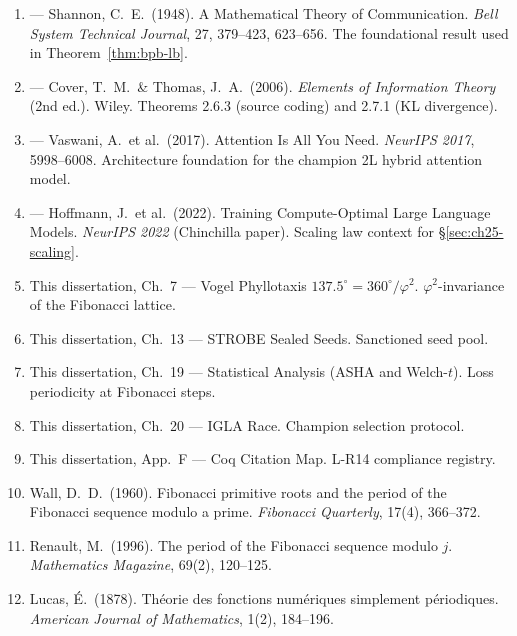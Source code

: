 \begin{enumerate}
\item {} ---
  Shannon, C.\ E.\ (1948). A Mathematical Theory of Communication.
  \emph{Bell System Technical Journal}, 27, 379--423, 623--656.
  The foundational result used in Theorem~\ref{thm:bpb-lb}.

\item {} ---
  Cover, T.\ M.\ \& Thomas, J.\ A.\ (2006).
  \emph{Elements of Information Theory} (2nd ed.).  Wiley.
  Theorems 2.6.3 (source coding) and 2.7.1 (KL divergence).

\item {} ---
  Vaswani, A.\ et al.\ (2017). Attention Is All You Need.
  \emph{NeurIPS 2017}, 5998--6008.
  Architecture foundation for the champion 2L hybrid attention model.

\item {} ---
  Hoffmann, J.\ et al.\ (2022). Training Compute-Optimal Large Language
  Models.  \emph{NeurIPS 2022} (Chinchilla paper).
  Scaling law context for §\ref{sec:ch25-scaling}.

\item This dissertation, Ch.~7 ---
  Vogel Phyllotaxis $137.5^\circ = 360^\circ/\varphi^2$.
  $\varphi^2$-invariance of the Fibonacci lattice.

\item This dissertation, Ch.~13 ---
  STROBE Sealed Seeds.  Sanctioned seed pool.

\item This dissertation, Ch.~19 ---
  Statistical Analysis (ASHA and Welch-$t$).
  Loss periodicity at Fibonacci steps.

\item This dissertation, Ch.~20 ---
  IGLA Race.  Champion selection protocol.

\item This dissertation, App.~F ---
  Coq Citation Map.  L-R14 compliance registry.

\item Wall, D.\ D.\ (1960). Fibonacci primitive roots and the period
  of the Fibonacci sequence modulo a prime.
  \emph{Fibonacci Quarterly}, 17(4), 366--372.

\item Renault, M.\ (1996). The period of the Fibonacci sequence
  modulo $j$.  \emph{Mathematics Magazine}, 69(2), 120--125.

\item Lucas, É.\ (1878). Théorie des fonctions numériques simplement
  périodiques.  \emph{American Journal of Mathematics}, 1(2), 184--196.


\end{enumerate}
